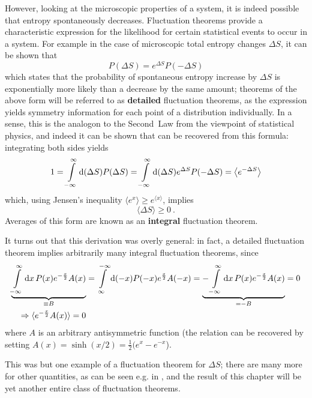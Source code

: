 However, looking at the microscopic properties of a system, it is indeed possible that entropy spontaneously decreases. Fluctuation theorems provide a characteristic expression for the likelihood for certain statistical events to occur in a system. For example in the case of microscopic total entropy changes \(\Delta S\), it can be shown that
%
\begin{equation}
	P(\Delta S) = e^{\Delta S}P(-\Delta S)
\end{equation}
%
which states that the probability of spontaneous entropy increase by \(\Delta S\) is exponentially more likely than a decrease by the same amount; theorems of the above form will be referred to as \textbf{detailed} fluctuation theorems, as the expression yields symmetry information for each point of a distribution individually. In a sense, this is the analogon to the Second~Law from the viewpoint of statistical physics, and indeed it can be shown that  can be recovered from this formula: integrating both sides yields
%
\begin{equation}
	\label{eqn:average of exp}
	1 = \int\limits_{-\infty}^\infty \mathrm{d} (\Delta S) P(\Delta S) = \int\limits_{-\infty}^\infty \mathrm{d} (\Delta S) e^{\Delta S}P(-\Delta S) = \left\langle e^{-\Delta S} \right\rangle
\end{equation}
%
which, using Jensen's inequality \(\langle e^x\rangle \geq e^{\langle x\rangle}\), implies
%
\begin{equation}
	\langle\Delta S\rangle \geq 0 ~.
\end{equation}
%
Averages of this form are known as an \textbf{integral} fluctuation theorem.

It turns out that this derivation was overly general: in fact, a detailed fluctuation theorem implies arbitrarily many integral fluctuation theorems, since
%
\begin{align}
	\notag
	   \underbrace{\int\limits_{-\infty}^\infty\mathrm{d} x \, P(x) e^{-\frac x2}A(x)}_{\equiv B}
	&= \int\limits_\infty^{-\infty}\mathrm{d}(-x) P(-x) e^{\frac x2}A(-x)
	 = \underbrace{- \int\limits_{-\infty}^\infty\mathrm{d} x \, P(x) e^{-\frac x2}A(x)}_{= -B}
	 = 0
	\\
	\label{eqn:antisymmetric exp average}
	\Rightarrow
	\langle e^{-\frac x2}A(x)\rangle = 0
\end{align}
%
where \(A\) is an arbitrary antisymmetric function (the relation  can be recovered by setting \(A(x) = \sinh(x/2) = \frac12(e^x-e^{-x}\)).

This was but one example of a fluctuation theorem for \(\Delta S\); there are many more for other quantities, as can be seen e.g. in \cite{seifert-review}, and the result of this chapter will be yet another entire class of fluctuation theorems.


